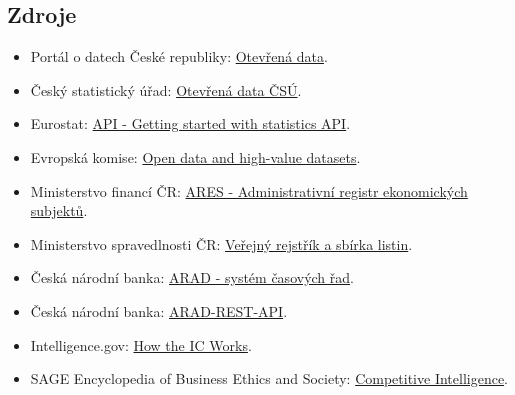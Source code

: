 \subsection{Zdroje}
\begin{itemize}
  \item Portál o datech České republiky: \href{https://data.gov.cz/pro-u\%C5\%BEivatele/otev\%C5\%99en\%C3\%A1-data/}{Otevřená data}.
  \item Český statistický úřad: \href{https://opendata.csu.gov.cz/}{Otevřená data ČSÚ}.
  \item Eurostat: \href{https://ec.europa.eu/eurostat/web/user-guides/data-browser/api-data-access/api-getting-started/api}{API - Getting started with statistics API}.
  \item Evropská komise: \href{https://digital-strategy.ec.europa.eu/en/factpages/open-data-and-high-value-datasets-step-step-access-guide}{Open data and high-value datasets}.
  \item Ministerstvo financí ČR: \href{https://mf.gov.cz/cs/ministerstvo/informacni-systemy/ares}{ARES - Administrativní registr ekonomických subjektů}.
  \item Ministerstvo spravedlnosti ČR: \href{https://verejnerejstriky.msp.gov.cz/clanky/obecne-informace/verejny-rejstrik-a-sbirka-listin}{Veřejný rejstřík a sbírka listin}.
  \item Česká národní banka: \href{https://www.cnb.cz/cs/statistika/arad-system-casovych-rad/}{ARAD - systém časových řad}.
  \item Česká národní banka: \href{https://www.cnb.cz/docs/arad20/dokumentace/arad_rest_api_cs.pdf}{ARAD-REST-API}.
  \item Intelligence.gov: \href{https://www.intelligence.gov/how-the-ic-works}{How the IC Works}.
  \item SAGE Encyclopedia of Business Ethics and Society: \href{https://sk.sagepub.com/ency/edvol/embed/sage-encyclopedia-of-business-ethics-and-society-2e/chpt/competitive-intelligence}{Competitive Intelligence}.
\end{itemize}

\newpage
